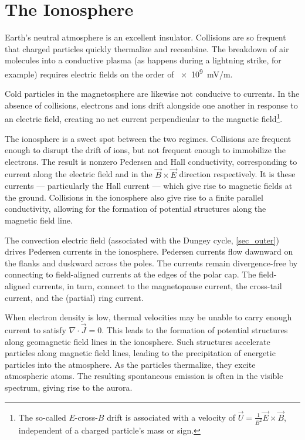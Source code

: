 \section{The Ionosphere}
  \label{sec_ionos}

Earth's neutral atmosphere is an excellent insulator. Collisions are so frequent that charged particles quickly thermalize and recombine. The breakdown of air molecules into a conductive plasma (as happens during a lightning strike, for example) requires electric fields on the order of \SI{e9}{\mV/\m}. 

Cold particles in the magnetosphere are likewise not conducive to currents. In the absence of collisions, electrons and ions drift alongside one another in response to an electric field, creating no net current perpendicular to the magnetic field\footnote{The so-called $E$-cross-$B$ drift is associated with a velocity of $\vec{U} = \frac{1}{B^2} \vec{E} \times \vec{B}$, independent of a charged particle's mass or sign. }. 

The ionosphere is a sweet spot between the two regimes. Collisions are frequent enough to disrupt the drift of ions, but not frequent enough to immobilize the electrons. The result is nonzero Pedersen and Hall conductivity, corresponding to current along the electric field and in the $\vec{B} \times \vec{E}$ direction respectively. It is these currents --- particularly the Hall current --- which give rise to magnetic fields at the ground. Collisions in the ionosphere also give rise to a finite parallel conductivity, allowing for the formation of potential structures along the magnetic field line. 


The convection electric field (associated with the Dungey cycle, \cref{sec_outer}) drives Pedersen currents in the ionosphere. Pedersen currents flow dawnward on the flanks and duskward across the poles. The currents remain divergence-free by connecting to field-aligned currents at the edges of the polar cap. The field-aligned currents, in turn, connect to the magnetopause current, the cross-tail current, and the (partial) ring current. 

When electron density is low, thermal velocities may be unable to carry enough current to satisfy $\nabla \cdot \vec{J} = 0$. This leads to the formation of potential structures along geomagnetic field lines in the ionosphere. Such structures accelerate particles along magnetic field lines, leading to the precipitation of energetic particles into the atmosphere. As the particles thermalize, they excite atmospheric atoms. The resulting spontaneous emission is often in the visible spectrum, giving rise to the aurora. 

